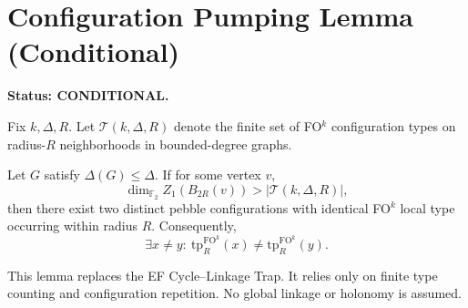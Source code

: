 \section*{Configuration Pumping Lemma (Conditional)}

\textbf{Status: CONDITIONAL.}

Fix $k,\Delta,R$.  
Let $\mathcal T(k,\Delta,R)$ denote the finite set of FO$^k$ configuration
types on radius-$R$ neighborhoods in bounded-degree graphs.

\begin{lemma}
Let $G$ satisfy $\Delta(G)\le\Delta$.
If for some vertex $v$,
\[
\dim_{\mathbb F_2} Z_1(B_{2R}(v)) > |\mathcal T(k,\Delta,R)|,
\]
then there exist two distinct pebble configurations with identical
FO$^k$ local type occurring within radius $R$.
Consequently,
\[
\exists x\neq y:\ \mathrm{tp}^{\mathrm{FO}^k}_R(x)\neq
\mathrm{tp}^{\mathrm{FO}^k}_R(y).
\]
\end{lemma}

\begin{remark}
This lemma replaces the EF Cycle--Linkage Trap.
It relies only on finite type counting and configuration repetition.
No global linkage or holonomy is assumed.
\end{remark}

